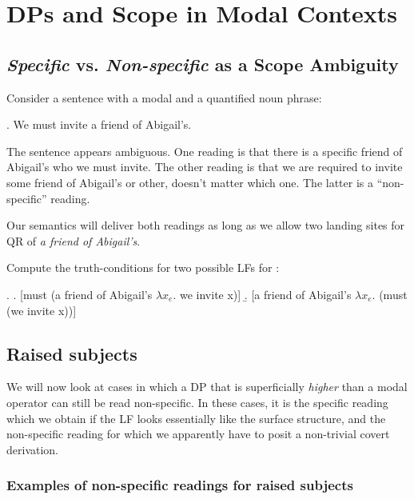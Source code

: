 
\chapter{DPs and Scope in Modal Contexts}


\minitoc

\section{\emph{Specific} vs. \emph{Non-specific} as a Scope Ambiguity}

Consider a sentence with a modal and a quantified noun phrase:

\ex. We must invite a friend of Abigail's.

The sentence appears ambiguous. One reading is that there is a specific friend of Abigail's who we must invite. The other reading is that we are required to invite some friend of Abigail's or other, doesn't matter which one. The latter is a ``non-specific'' reading.

Our semantics will deliver both readings as long as we allow two landing sites for QR of \emph{a friend of Abigail's}.

\begin{exercise}

Compute the truth-conditions for two possible LFs for \Last:

\ex. 
\a. [must (a friend of Abigail's $\lambda x_e.$ we invite x)]
\b. [a friend of Abigail's $\lambda x_e.$ (must (we invite x))] \eex

\end{exercise}

\section{Raised subjects}

We will now look at cases in which a DP that is superficially \emph{higher} than a modal operator can still be read non-specific. In these cases, it is the specific reading which we obtain if the LF looks essentially like the surface structure, and the non-specific reading for which we apparently have to posit a non-trivial covert derivation.

\subsection{Examples of non-specific readings for raised subjects}


